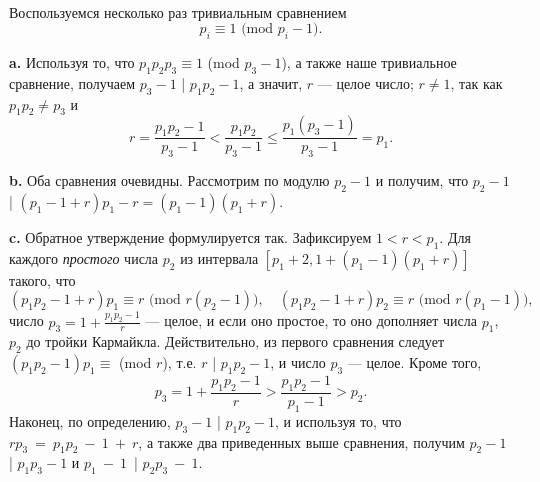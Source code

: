 \documentclass{mai_book}
\begin{document}
 \\

Воспользуемся несколько раз тривиальным сравнением
\begin{equation*}
	p_i \equiv 1 \text{ (mod } p_i - 1).
\end{equation*}

\textbf{a. } Используя то, что $p_1 p_2 p_3 \equiv 1$ (mod $p_3 - 1$), а также наше тривиальное сравнение, получаем $p_3 - 1$ | $p_1 p_2 - 1$, а значит, $r$ --- целое число; $r \neq 1$, так как $p_1 p_2 \neq p_3$ и
\begin{equation*}
	r = \frac{p_1 p_2 - 1}{p_3 - 1} < \frac{p_1 p_2}{p_3 - 1} \le \frac{p_1 (p_3 - 1)}{p_3 - 1} = p_1.
\end{equation*}

\textbf{b. } Оба сравнения очевидны. Рассмотрим по модулю $p_2 - 1$ и получим, что $p_2 - 1$ | $(p_1 - 1 + r)p_1 - r = (p_1 - 1)(p_1 + r)$. \smallskip

\textbf{c. } Обратное утверждение формулируется так. Зафиксируем $1 < r < p_1$. Для каждого \textit{простого} числа $p_2$ из интервала $[p_1 + 2, 1 + (p_1 - 1)(p_1 + r)]$ такого, что
\begin{equation*}
	(p_1 p_2 - 1 + r)p_1 \equiv r \text{ (mod } r(p_2 - 1)), \quad (p_1 p_2 - 1 + r)p_2 \equiv r \text{ (mod } r(p_1 -1)),
\end{equation*}
число $p_3 = 1 + \frac{p_1 p_2 - 1}{r}$ --- целое, и если оно простое, то оно дополняет числа $p_1$, $p_2$ до тройки Кармайкла. Действительно, из первого сравнения следует $(p_1 p_2 - 1)p_1 \equiv$ (mod $r$), т.е. $r$ | $p_1 p_2 -1$, и число $p_3$ --- целое. Кроме того,
\begin{equation*}
	p_3 = 1 + \frac{p_1 p_2 - 1}{r} > \frac{p_1 p_2 - 1}{p_1 - 1} > p_2.
\end{equation*}
Наконец, по определению, $p_3 - 1$ | $p_1 p_2 - 1$, и используя то, что $rp_3~=~p_1p_2~-~1~+~r$, а также два приведенных выше сравнения, получим $p_2 - 1$ | $p_1 p_3 - 1$ и $p_1~-~1$~| $p_2p_3~-~1$.
\end{document}
